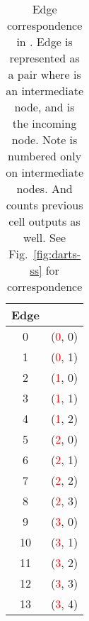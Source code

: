 \documentclass[runningheads]{llncs}
\begin{document}
\begin{table}
	\begin{center}
		\caption{Edge correspondence in . Edge  is represented as a pair  where  is an intermediate node, and  is the incoming node. Note  is numbered only on intermediate nodes. And  counts previous cell outputs as well. See Fig.~\ref{fig:darts-ss} for correspondence}
		\label{tab:darts-edge-s1}
		\begin{footnotesize}
			\begin{tabular}{cl}
				\hline
				Edge &   \\
				\hline
				0 & (\textcolor{red}{0}, 0)\\
				1 & (\textcolor{red}{0}, 1)\\
				2 & (\textcolor{red}{1}, 0)\\
				3 & (\textcolor{red}{1}, 1)\\
				4 & (\textcolor{red}{1}, 2)\\
				5 & (\textcolor{red}{2}, 0)\\
				6 & (\textcolor{red}{2}, 1)\\
				7 & (\textcolor{red}{2}, 2)\\
				8 & (\textcolor{red}{2}, 3)\\
				9 & (\textcolor{red}{3}, 0)\\
				10 & (\textcolor{red}{3}, 1)\\
				11 & (\textcolor{red}{3}, 2)\\
				12 & (\textcolor{red}{3}, 3)\\
				13 & (\textcolor{red}{3}, 4)\\
				\hline
			\end{tabular}
		\end{footnotesize}
	\end{center}
	
\end{table}
\end{document}
